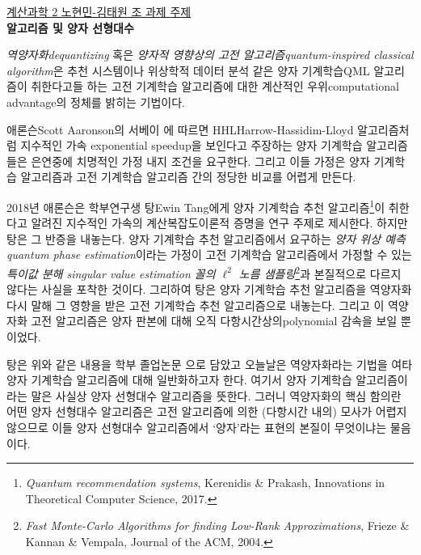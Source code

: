\documentclass[a4paper,hidelinks]{oblivoir}
\begin{document}
\thispagestyle{empty}
\begin{center}
  \underline{계산과학 2 노현민-김태원 조 과제 주제} \\
  \textbf{ 알고리즘 및 양자 선형대수} \\ 
\end{center}
\emph{역양자화\footnotesize dequantizing} 혹은 \emph{양자적 영향상의
고전 알고리즘\footnotesize quantum-inspired classical algorithm}은 추천
시스템이나 위상학적 데이터 분석 같은 양자 기계학습{\footnotesize QML}
알고리즘이 취한다고들 하는 고전 기계학습 알고리즘에 대한 계산적인 
우위{\footnotesize computational advantage}의 정체를 밝히는 기법이다.

애론슨{\footnotesize Scott Aaronson}의 서베이 에 따르면
HHL{\footnotesize Harrow-Hassidim-Lloyd} 알고리즘처럼 지수적인 가속{\footnotesize
exponential speedup}을 보인다고 주장하는 양자 기계학습 알고리즘들은 
은연중에 치명적인 가정 내지 조건을 요구한다. 그리고
이들 가정은 양자 기계학습 알고리즘과 고전 기계학습 알고리즘 간의 정당한
비교를 어렵게 만든다.

2018년 애론슨은 학부연구생 탕{\footnotesize Ewin Tang}에게
양자 기계학습 추천 알고리즘\footnote{\emph{Quantum recommendation systems},
  Kerenidis \& Prakash, Innovations in Theoretical Computer Science, 
2017.}이 취한다고 알려진 지수적인 가속의 계산복잡도이론적 증명을 연구 주제로
제시한다. 하지만 탕은 그 반증을 내놓는다. 양자 기계학습 추천 알고리즘에서
요구하는 \emph{양자 위상 예측\footnotesize quantum phase estimation}이라는
가정이 고전 기계학습 알고리즘에서 가정할 수 있는 \emph{특이값 분해{\footnotesize
singular value estimation} 꼴의 $\ell^2$ 노름 샘플링}\footnote{\emph{Fast
Monte-Carlo Algorithms for finding Low-Rank Approximations}, Frieze \& Kannan
\& Vempala, Journal of the ACM, 2004.}과 본질적으로 다르지 않다는 사실을 포착한
것이다. 그리하여 탕은 양자 기계학습 추천 알고리즘을 역양자화 다시 말해 그 영향을
받은 고전 기계학습 추천 알고리즘으로 내놓는다. 그리고 이 역양자화 고전 알고리즘은
양자 판본에 대해 오직 다항시간상의{\tiny polynomial} 감속을 보일 뿐이었다.

탕은 위와 같은 내용을 학부 졸업논문 으로 담았고 오늘날은 역양자화라는
기법을 여타 양자 기계학습 알고리즘에 대해 일반화하고자 한다. 여기서 양자 기계학습 
알고리즘이라는 말은 사실상 양자 선형대수 알고리즘을 뜻한다. 그러니 역양자화의
핵심 함의란 어떤 양자 선형대수 알고리즘은 고전 알고리즘에 의한 (다항시간 내의) 
모사가 어렵지 않으므로 이들 양자 선형대수 알고리즘에서 `양자'라는 표현의 본질이
무엇이냐는 물음이다. 
\end{document}
